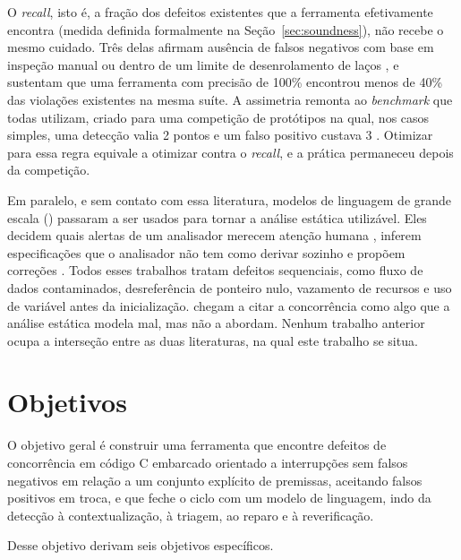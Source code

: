 O \textit{recall}, isto é, a fração dos defeitos existentes que a ferramenta
efetivamente encontra (medida definida formalmente na
Seção~\ref{sec:soundness}), não recebe o mesmo cuidado. Três delas afirmam ausência de falsos
negativos com base em inspeção manual ou dentro de um limite de desenrolamento
de laços \cite{sdracer,intrace,nichecker}, e  sustentam que
uma ferramenta com precisão de 100\% encontrou menos de 40\% das violações
existentes na mesma suíte. A assimetria remonta ao \textit{benchmark} que
todas utilizam, criado para uma competição de protótipos na qual, nos casos
simples, uma detecção valia 2 pontos e um falso positivo custava 3
\cite{racebench}. Otimizar para essa regra equivale a
otimizar contra o \textit{recall}, e a prática permaneceu depois da competição.

Em paralelo, e sem contato com essa literatura, modelos de linguagem de grande
escala (\llm) passaram a ser usados para tornar a análise estática utilizável.
Eles decidem quais alertas de um analisador merecem atenção humana
\cite{llift,chatgpt-static,reducing-fp}, inferem especificações que o
analisador não tem como derivar sozinho \cite{iris,adataint} e propõem
correções \cite{skipanalyzer,sastgenius}. Todos esses trabalhos tratam defeitos
sequenciais, como fluxo de dados contaminados, desreferência de ponteiro nulo,
vazamento de recursos e uso de variável antes da inicialização.
 chegam a citar a concorrência como algo que a análise
estática modela mal, mas não a abordam. Nenhum trabalho anterior ocupa a
interseção entre as duas literaturas, na qual este trabalho se situa.

\section{Objetivos}
\label{sec:objetivos}

O objetivo geral é construir uma ferramenta que encontre defeitos de
concorrência em código C embarcado orientado a interrupções sem falsos
negativos em relação a um conjunto explícito de premissas, aceitando falsos
positivos em troca, e que feche o ciclo com um modelo de linguagem, indo da
detecção à contextualização, à triagem, ao reparo e à reverificação.

Desse objetivo derivam seis objetivos específicos.

